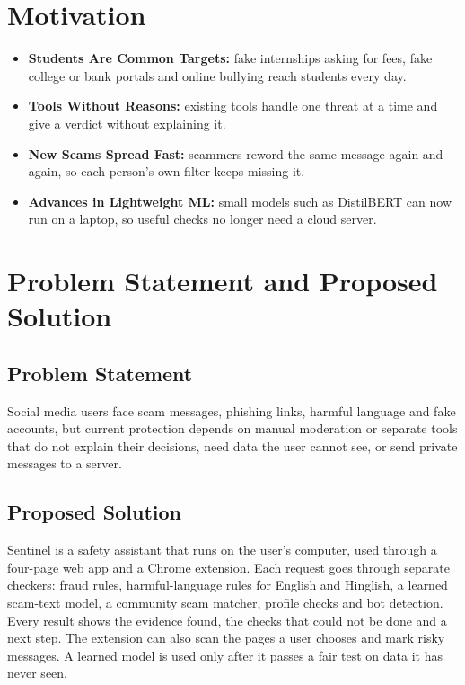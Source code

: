 \section{Motivation}
\begin{itemize}
\item \textbf{Students Are Common Targets:} fake internships asking for fees, fake college or bank portals and online bullying reach students every day.
\item \textbf{Tools Without Reasons:} existing tools handle one threat at a time and give a verdict without explaining it.
\item \textbf{New Scams Spread Fast:} scammers reword the same message again and again, so each person's own filter keeps missing it.
\item \textbf{Advances in Lightweight ML:} small models such as DistilBERT can now run on a laptop, so useful checks no longer need a cloud server.
\end{itemize}

\section{Problem Statement and Proposed Solution}
\subsection{Problem Statement}
\noindent Social media users face scam messages, phishing links, harmful language and fake accounts, but current protection depends on manual moderation or separate tools that do not explain their decisions, need data the user cannot see, or send private messages to a server.

\subsection{Proposed Solution}
\noindent Sentinel is a safety assistant that runs on the user's computer, used through a four-page web app and a Chrome extension. Each request goes through separate checkers: fraud rules, harmful-language rules for English and Hinglish, a learned scam-text model, a community scam matcher, profile checks and bot detection. Every result shows the evidence found, the checks that could not be done and a next step. The extension can also scan the pages a user chooses and mark risky messages. A learned model is used only after it passes a fair test on data it has never seen.

